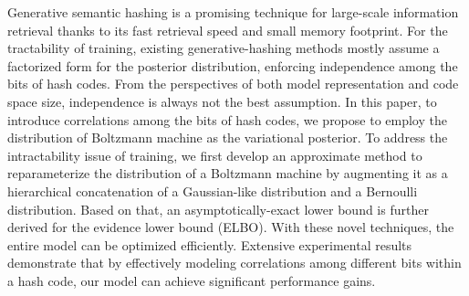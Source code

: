 Generative semantic hashing is a promising technique for large-scale information retrieval thanks to its fast retrieval speed and small memory footprint. For the tractability of training, existing generative-hashing methods mostly assume a factorized  form for the posterior distribution, enforcing independence among the bits of hash codes. From the perspectives of both model representation and code space size, independence is always not the best assumption. In this paper, to introduce correlations among the bits of hash codes, we propose to employ the distribution of Boltzmann machine as the variational posterior. To address the intractability issue of training, we first develop an approximate method to reparameterize the distribution of a Boltzmann machine by augmenting it as a hierarchical concatenation of a Gaussian-like distribution and a Bernoulli distribution. Based on that, an asymptotically-exact lower bound is further derived for the evidence lower bound (ELBO). With these novel techniques, the entire model can be optimized efficiently. Extensive experimental results demonstrate that by effectively modeling correlations among different bits within a hash code, our model can achieve significant performance gains.
